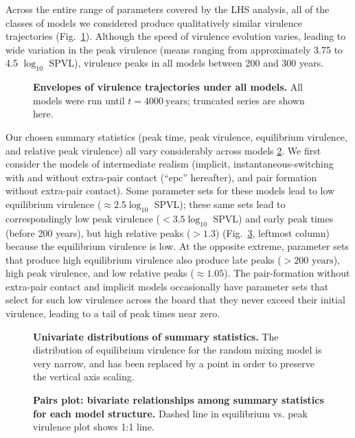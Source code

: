 \documentclass[10pt,letterpaper]{article}
\newcommand{\Lspvl}{$\log_{10}$ SPVL}
\begin{document}
Across the entire range of parameters covered by the LHS analysis, all of the classes of models we considered produce qualitatively similar virulence trajectories (Fig.~\ref{fig:virtraj}). Although the speed of virulence evolution varies, leading to wide variation in the peak virulence (means ranging from approximately 3.75 to 4.5 \Lspvl), virulence peaks in all models between 200 and 300 years.

\begin{figure}[!h]
\caption{{\bf Envelopes of virulence trajectories under all models.}
All models were run until $t=4000~\textrm{years}$; truncated series are shown here.}
\label{fig:virtraj}
\end{figure}

Our chosen summary statistics (peak time, peak virulence, equilibrium
virulence, and relative peak virulence) all vary considerably across models
\ref{fig:unidist}.
We first consider the models of intermediate realism (implicit,
instantaneous-switching with and without extra-pair contact (``epc'' hereafter), and
pair formation without extra-pair contact). Some parameter
sets for these models lead to low equilibrium virulence ($\approx 2.5 \log_{10}$ SPVL);
these same sets lead to correspondingly low
peak virulence ($< 3.5 \log_{10}$ SPVL) and early peak times (before 200 years), 
but high relative peaks ($>1.3$)
(Fig.~\ref{fig:pairplot}, leftmost column) because the equilibrium virulence is low.
At the opposite extreme, parameter sets that produce high equilibrium virulence 
also produce late peaks ($> 200 \text{ years}$), 
high peak virulence, and low relative peaks ($\approx 1.05$).
The pair-formation without extra-pair contact and implicit models
occasionally have parameter sets that select for such low virulence across
the board that they never exceed their initial virulence, leading to a tail
of peak times near zero.

\begin{figure}[!h]
\caption{{\bf Univariate distributions of summary statistics.}
The distribution of equilibrium virulence for the random mixing model is very narrow, and has been replaced by a point in order to preserve the vertical axis scaling.}
\label{fig:unidist}
\end{figure}

\begin{figure}[!h]
\caption{{\bf Pairs plot: bivariate relationships among summary statistics for each model structure.}
Dashed line in equilibrium vs. peak virulence plot shows 1:1 line.}
\label{fig:pairplot}
\end{figure}
\end{document}
